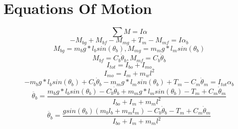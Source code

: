 \documentclass[12pt]{article}
\begin{document}
	\section{Equations Of Motion}
		\begin{equation}
			\sum M = I\alpha
		\end{equation}
		\begin{equation}
			-M_{bg}+M_{bf}-M_{mg}+T_m-M_{mf} = I\alpha_b
		\end{equation}
		\begin{equation}
			M_{bg} = m_b g*l_b sin(\theta_b), M_{mg} = m_m g*l_msin(\theta_b)
		\end{equation}
		\begin{equation}
			M_{bf} = C_b \dot{\theta}_b, M_{mf} = C_b \dot{\theta}_b
		\end{equation}
		\begin{equation}
			I_{tot} = I_{bo} + I_{mo}
		\end{equation}
		\begin{equation}
			I_{mo} = I_m+m_wl^2
		\end{equation}
		\begin{equation}
			-m_b g*l_b sin(\theta_b) + C_b \dot{\theta}_b - m_m g*l_msin(\theta_b) + T_m - C_m \dot{\theta}_m = I_{tot}\alpha_b
		\end{equation}
		\begin{equation}
			\ddot{\theta_b} = \frac{m_b g*l_b sin(\theta_b) - C_b \dot{\theta}_b + m_m g*l_msin(\theta_b) - T_m + C_m \dot{\theta}_m}{I_{bo}+I_m+m_ml^2}
		\end{equation}
		\begin{equation}
			\ddot{\theta_b} = \frac{gsin(\theta_b)(m_bl_b + m_ml_m) - C_b \dot{\theta}_b - T_m + C_m \dot{\theta}_m}{I_{bo}+I_m+m_ml^2}
		\end{equation}
\end{document}
